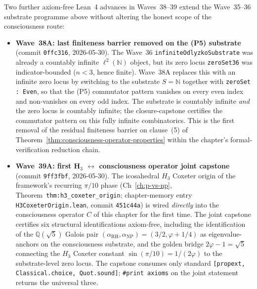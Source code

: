 \begin{remark}\label{rem:consciousness-wave38-39-lean}
Two further axiom-free Lean~4 advances in Waves~38--39 extend the Wave~35--36 substrate programme above without altering the honest scope of the consciousness route:
\begin{itemize}
  \item \textbf{Wave~38A: last finiteness barrier removed on the (P5) substrate} (commit \texttt{0ffc316}, 2026-05-30). The Wave~36 \texttt{infiniteOdlyzkoSubstrate} was already a countably infinite $\ell^2(\mathbb{N})$ object, but its zero locus \texttt{zeroSet36} was indicator-bounded ($n < 3$, hence finite). Wave~38A replaces this with an infinite zero locus by switching to the substrate $S = \mathbb{N}$ together with \texttt{zeroSet : Even}, so that the (P5) commutator pattern vanishes on every even index and non-vanishes on every odd index. The substrate is countably infinite \emph{and} the zero locus is countably infinite; the closure-capstone certifies the commutator pattern on this fully infinite combinatorics. This is the first removal of the residual finiteness barrier on clause~(5) of Theorem~\ref{thm:consciousness-operator-properties} within the chapter's formal-verification reduction chain.
  \item \textbf{Wave~39A: first H$_3$ $\leftrightarrow$ consciousness operator joint capstone} (commit \texttt{9ff3fbf}, 2026-05-30). The icosahedral $H_3$ Coxeter origin of the framework's recurring $\pi/10$ phase (Ch~\ref{ch:p-vs-np}, Theorem~\texttt{thm:h3\_coxeter\_origin}; chapter-memory entry \texttt{H3CoxeterOrigin.lean}, commit \texttt{451c44a}) is wired \emph{directly} into the consciousness operator $C$ of this chapter for the first time. The joint capstone certifies six structural identifications axiom-free, including the identification of the $\mathbb{Q}(\sqrt{5})$ Galois pair $(\alpha_{\mathrm{RH}}, \alpha_{\mathrm{NP}}) = (3/2, \varphi + 1/4)$ as eigenvalue-anchors on the consciousness substrate, and the golden bridge $2\varphi - 1 = \sqrt{5}$ connecting the $H_3$ Coxeter constant $\sin(\pi/10) = 1/(2\varphi)$ to the substrate-level zero locus. The capstone consumes only standard \texttt{[propext, Classical.choice, Quot.sound]}; \texttt{\#print axioms} on the joint statement returns the universal three.
\end{itemize}


\end{remark}
